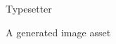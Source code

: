 \documentclass{article}
\begin{document}
\pagecolor{blue!7}
\vspace*{\fill}
\begin{center}
    {\color{blue!65!black}\Huge Typesetter}\par
    \vspace{3mm}
    {\color{black!70}\large A generated image asset}
\end{center}
\vspace*{\fill}
\end{document}
